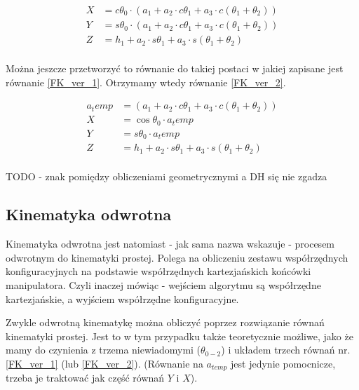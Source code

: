 \begin{equation} \label{FK_ver_2_initial}
\begin{split}
X &= c\theta_0 \cdot \left( a_1 + a_2 \cdot c\theta_1 + a_3  \cdot c\left( \theta_1 + \theta_2 \right) \right)\\
Y &= s\theta_0 \cdot \left( a_1 + a_2 \cdot c\theta_1 + a_3  \cdot c\left( \theta_1 + \theta_2 \right) \right)\\
Z &= h_1 + a_2 \cdot s\theta_1 + a_3 \cdot s\left( \theta_1 + \theta_2 \right)\\
\end{split}
\end{equation}

Można jeszcze przetworzyć to równanie do takiej postaci w jakiej zapisane jest równanie \ref{FK_ver_1}. Otrzymamy wtedy równanie \ref{FK_ver_2}.

\begin{equation} \label{FK_ver_2}
\begin{split}
a_temp &= \left( a_1 + a_2 \cdot c\theta_1 + a_3  \cdot c\left( \theta_1 + \theta_2 \right) \right)\\
X &= \cos{\theta_0} \cdot a_temp\\
Y &= s\theta_0 \cdot a_temp\\
Z &= h_1 + a_2 \cdot s\theta_1 + a_3 \cdot s\left( \theta_1 + \theta_2 \right)\\
\end{split}
\end{equation}



TODO - znak pomiędzy obliczeniami geometrycznymi a DH się nie zgadza


\subsection{Kinematyka odwrotna}
Kinematyka odwrotna jest natomiast - jak sama nazwa wskazuje - procesem odwrotnym do kinematyki prostej. Polega na obliczeniu zestawu współrzędnych konfiguracyjnych na podstawie współrzędnych kartezjańskich końcówki manipulatora. Czyli inaczej mówiąc - wejściem algorytmu są współrzędne kartezjańskie, a wyjściem współrzędne konfiguracyjne.

Zwykle odwrotną kinematykę można obliczyć poprzez rozwiązanie równań kinematyki prostej. Jest to w tym przypadku także teoretycznie możliwe, jako że mamy do czynienia z trzema niewiadomymi ($\theta_{0-2}$) i układem trzech równań nr. \ref{FK_ver_1} (lub \ref{FK_ver_2}). (Równanie na $a_{temp}$ jest jedynie pomocnicze, trzeba je traktować jak część równań $Y$ i $X$).

